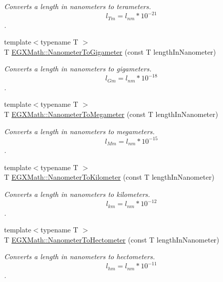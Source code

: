 \begin{DoxyCompactItemize}
\begin{DoxyCompactList}\small\item\em Converts a length in nanometers to terameters. \[ l_{Tm}=l_{nm} * 10^{-21} \]. \end{DoxyCompactList}\item 
{\footnotesize template$<$typename T $>$ }\\T \mbox{\hyperlink{group___e_g_x_math-_conversions-_length_conversions-_s_i-_nanometer-_s_i_ga235d244736444af6437d9086ae1f485d}{E\+G\+X\+Math\+::\+Nanometer\+To\+Gigameter}} (const T length\+In\+Nanometer)
\begin{DoxyCompactList}\small\item\em Converts a length in nanometers to gigameters. \[ l_{Gm}=l_{nm} * 10^{-18} \]. \end{DoxyCompactList}\item 
{\footnotesize template$<$typename T $>$ }\\T \mbox{\hyperlink{group___e_g_x_math-_conversions-_length_conversions-_s_i-_nanometer-_s_i_gabe3584b4139cea97ebc372abf99fc63e}{E\+G\+X\+Math\+::\+Nanometer\+To\+Megameter}} (const T length\+In\+Nanometer)
\begin{DoxyCompactList}\small\item\em Converts a length in nanometers to megameters. \[ l_{Mm}=l_{nm} * 10^{-15} \]. \end{DoxyCompactList}\item 
{\footnotesize template$<$typename T $>$ }\\T \mbox{\hyperlink{group___e_g_x_math-_conversions-_length_conversions-_s_i-_nanometer-_s_i_gaadb5b2460069bb749412818e7aa6ee3b}{E\+G\+X\+Math\+::\+Nanometer\+To\+Kilometer}} (const T length\+In\+Nanometer)
\begin{DoxyCompactList}\small\item\em Converts a length in nanometers to kilometers. \[ l_{km}=l_{nm} * 10^{-12} \]. \end{DoxyCompactList}\item 
{\footnotesize template$<$typename T $>$ }\\T \mbox{\hyperlink{group___e_g_x_math-_conversions-_length_conversions-_s_i-_nanometer-_s_i_ga106931c80902a638a38099d2fe2ba99e}{E\+G\+X\+Math\+::\+Nanometer\+To\+Hectometer}} (const T length\+In\+Nanometer)
\begin{DoxyCompactList}\small\item\em Converts a length in nanometers to hectometers. \[ l_{hm}=l_{nm} * 10^{-11} \]. \end{DoxyCompactList}\item 

\end{DoxyCompactItemize}
